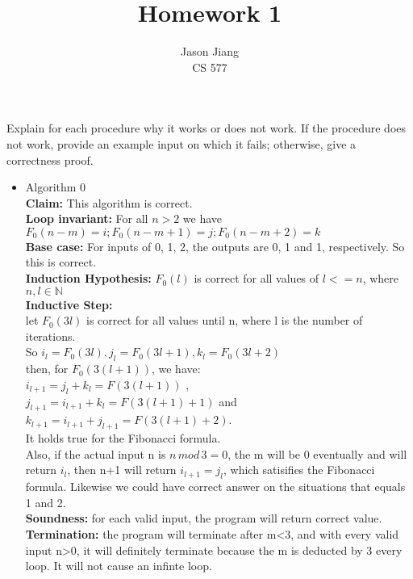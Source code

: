 \documentclass[12pt]{article}
\newenvironment{question}[2][Question]{\begin{trivlist}
\item[\hskip \labelsep {\bfseries #1}\hskip \labelsep {\bfseries #2.}]}{\end{trivlist}}
\begin{document}
 

\title{Homework 1}
\author{Jason Jiang\\ 
CS 577} 
 
\maketitle
 
\begin{question}{1} 
Explain for each procedure why it works or does not work. If the procedure does not work, provide an example input on which it fails; otherwise, give a correctness proof.
\end{question}
 
\begin{itemize}
    \item Algorithm 0\\
        \textbf{Claim:} This algorithm is correct.\\
        \textbf{Loop invariant:} For all $n>2$ we have $F_0(n-m)=i; F_0(n-m+1)=j;F_0(n-m+2) = k$\\

        \textbf{Base case:} For inputs of 0, 1, 2, the outputs are 0, 1 and 1, respectively. So this is correct. \\
        \textbf{Induction Hypothesis:} $F_0(l)$ is correct for all values of $l<=n$, where $n,l\in \mathbb{N}$ \\
        \textbf{Inductive Step:} \\
            let $F_0(3l)$ is correct for all values until n, where l is the number of iterations. \\
            So $i_l=F_0(3l), j_l=F_0(3l+1), k_l=F_0(3l+2)$ \\
            then, for $F_0(3(l+1))$, we have:\\
            $i_{l+1}=j_l+k_l=F(3(l+1))$ ,\\
            $j_{l+1}=i_{l+1}+k_l=F(3(l+1)+1)$  and \\
            $k_{l+1}=i_{l+1}+j_{l+1}=F(3(l+1)+2)$. \\
            It holds true for the Fibonacci formula. \\
            Also, if the actual input n is $n\,mod\,3=0$, the m will be 0 eventually and will return $i_{l}$, then n+1 will return $i_{l+1}=j_l$, which satisifies the Fibonacci formula. Likewise we could have correct answer on the situations that equals 1 and 2. \\
            \textbf{Soundness: } for each valid input, the program will return correct value.\\
            \textbf{Termination: } the program will terminate after m<3, and with every valid input n>0, it will definitely terminate because the m is deducted by 3 every loop. It will not cause an infinte loop.



\end{itemize}
\end{document}
